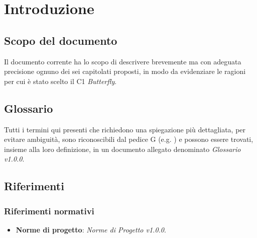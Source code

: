 \section{Introduzione} \label{introduzione}
    \subsection{Scopo del documento}
    Il documento corrente ha lo scopo di descrivere brevemente ma con adeguata precisione ognuno dei sei capitolati proposti,
    in modo da evidenziare le ragioni per cui è stato scelto il  C1 \textit{Butterfly}.

    \subsection{Glossario}
    Tutti i termini qui presenti che richiedono una spiegazione più dettagliata, per evitare ambiguit\`a,
    sono riconoscibili dal pedice G (e.g. )
    e possono essere trovati, insieme alla loro definizione, in un documento allegato denominato \textit{Glossario v1.0.0}.

    \subsection{Riferimenti}

        \subsubsection{Riferimenti normativi}
            \begin{itemize}
                \item \textbf{Norme di progetto}: \textit{Norme di Progetto v1.0.0}.
            \end{itemize}

